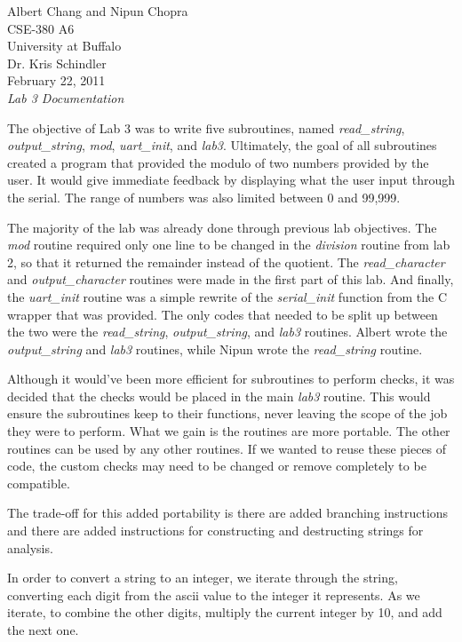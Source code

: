 \documentclass[letterpaper,10pt]{article}
\begin{document}
    Albert Chang and Nipun Chopra\\
    CSE-380 A6\\
    University at Buffalo\\
    Dr. Kris Schindler\\
    February 22, 2011\\
    \textit{Lab 3 Documentation}

    The objective of Lab 3 was to write five subroutines, named
    \textit{read\_string}, \textit{output\_string}, \textit{mod},
    \textit{uart\_init}, and \textit{lab3}. Ultimately, the goal of all
    subroutines created a program that provided the modulo of two numbers
    provided by the user. It would give immediate feedback by displaying what
    the user input through the serial. The range of numbers was also limited
    between 0 and 99,999.

    The majority of the lab was already done through previous lab objectives.
    The \textit{mod} routine required only one line to be changed in the
    \textit{division} routine from lab 2, so that it returned the remainder
    instead of the quotient. The \textit{read\_character} and
    \textit{output\_character} routines were made in the first part of this lab.
    And finally, the \textit{uart\_init} routine was a simple rewrite of the
    \textit{serial\_init} function from the C wrapper that was provided. The
    only codes that needed to be split up between the two were the
    \textit{read\_string}, \textit{output\_string}, and \textit{lab3}  routines.
    Albert wrote the \textit{output\_string} and \textit{lab3} routines, while
    Nipun wrote the \textit{read\_string} routine.

    Although it would've been more efficient for subroutines to perform checks,
    it was decided that  the checks would be placed in the main \textit{lab3}
    routine. This would ensure the subroutines keep to their functions, never
    leaving the scope of the job they were to perform. What we gain is the
    routines are more portable. The other routines can be used by any other
    routines. If we wanted to reuse these pieces of code, the custom checks may
    need to be changed or remove completely to be compatible.
    
    The trade-off for this added portability is there are added branching
    instructions and there are added instructions for constructing and
    destructing strings for analysis.

    In order to convert a string to an integer, we iterate through the string,
    converting each digit from the ascii value to the integer it represents.
    As we iterate, to combine the other digits, multiply the current integer
    by 10, and add the next one.
\end{document}
